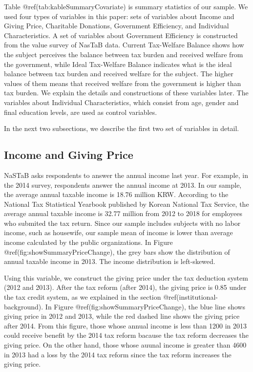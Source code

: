\documentclass[
]{article}
\begin{document}
\color{red}

Table @ref(tab:kableSummaryCovariate) is summary statistics of our sample.
We used four types of variables in this paper:
sets of variables about Income and Giving Price,
Charitable Donations,
Government Efficiency,
and Individual Characteristics.
A set of variables about Government Efficiency is constructed from the value survey of NasTaB data.
Current Tax-Welfare Balance shows how the subject perceives the balance between tax burden and received welfare from the government,
while Ideal Tax-Welfare Balance indicates what is the ideal balance between tax burden and received welfare for the subject.
The higher values of them means that received welfare from the government is higher than tax burden.
We explain the details and constructions of these variables later.
The variables about Individual Characteristics,
which consist from age, gender and final education levels, are used as control variables.

In the next two subsections,
we describe the first two set of variables in detail.

\hypertarget{income-and-giving-price}{%
\subsection{Income and Giving Price}\label{income-and-giving-price}}

NaSTaB asks respondents to answer the annual income last year.
For example, in the 2014 survey, respondents answer the annual income at 2013.
In our sample, the average annual taxable income is 18.76 million KRW.
According to the National Tax Statistical Yearbook published by Korean National Tax Service,
the average annual taxable income is 32.77 million from 2012 to 2018
for employees who submited the tax return.
Since our sample includes subjects with no labor income, such as housewife,
our sample mean of income is lower than average income calculated by the public organizations.
In Figure @ref(fig:showSummaryPriceChange),
the grey bars show the distribution of annual taxable income in 2013.
The income distribution is left-skewed.

Using this variable, we construct the giving price under the tax deduction system (2012 and 2013).
After the tax reform (after 2014), the giving price is 0.85 under the tax credit system,
as we explained in the section @ref(institutional-background).
In Figure @ref(fig:showSummaryPriceChange),
the blue line shows giving price in 2012 and 2013,
while the red dashed line shows the giving price after 2014.
From this figure,
those whose annual income is less than 1200 in 2013 could receive benefit by the 2014 tax reform
bacause the tax reform decreases the giving price.
On the other hand,
those whose auunal income is greater than 4600 in 2013 had a loss by the 2014 tax reform
since the tax reform increases the giving price.
\end{document}
